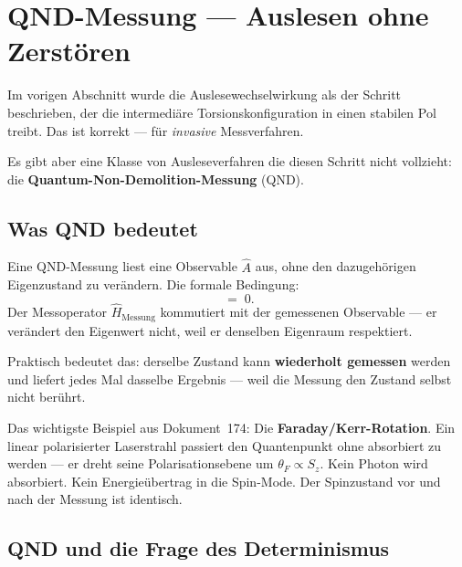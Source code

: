 \section{QND-Messung --- Auslesen ohne Zerstören}
\label{sec:qnd}

Im vorigen Abschnitt wurde die Auslesewechselwirkung
als der Schritt beschrieben, der die intermediäre
Torsionskonfiguration in einen stabilen Pol treibt.
Das ist korrekt --- für \emph{invasive} Messverfahren.

Es gibt aber eine Klasse von Ausleseverfahren die
diesen Schritt nicht vollzieht:
die \textbf{Quantum-Non-Demolition-Messung} (QND).

\subsection{Was QND bedeutet}

Eine QND-Messung liest eine Observable $\hat{A}$ aus,
ohne den dazugehörigen Eigenzustand zu verändern.
Die formale Bedingung:
\begin{equation}
  [\hat{A},\; \hat{H}_\text{Messung}] \;=\; 0.
\end{equation}
Der Messoperator $\hat{H}_\text{Messung}$ kommutiert
mit der gemessenen Observable --- er verändert den
Eigenwert nicht, weil er denselben Eigenraum respektiert.

Praktisch bedeutet das: derselbe Zustand kann
\textbf{wiederholt gemessen} werden und liefert
jedes Mal dasselbe Ergebnis --- weil die Messung
den Zustand selbst nicht berührt.

Das wichtigste Beispiel aus Dokument~174:
Die \textbf{Faraday/Kerr-Rotation}.
Ein linear polarisierter Laserstrahl passiert den
Quantenpunkt ohne absorbiert zu werden ---
er dreht seine Polarisationsebene um $\theta_F \propto S_z$.
Kein Photon wird absorbiert. Kein Energieübertrag
in die Spin-Mode. Der Spinzustand vor und nach
der Messung ist identisch.

\subsection{QND und die Frage des Determinismus}
\label{sec:qnd-beweis}

